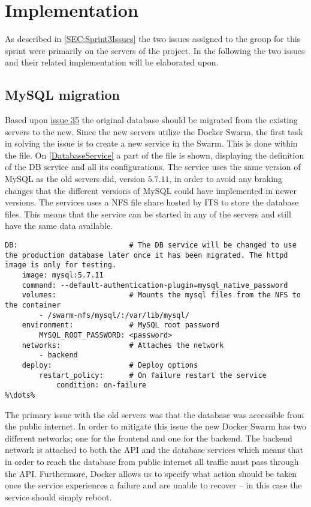 \section{Implementation}
As described in \autoref{SEC:Sprint3Issues} the two issues assigned to the group for this sprint were primarily on the servers of the project. 
In the following the two issues and their related implementation will be elaborated upon.

\subsection{MySQL migration}
Based upon \href{https://github.com/aau-giraf/wiki/issues/35}{issue 35} the original database should be migrated from the existing servers to the new. 
Since the new servers utilize the Docker Swarm, the first task in solving the issue is to create a new service in the Swarm. 
This is done within the  file. 
On \autoref{DatabaseService} a part of the file is shown, displaying the definition of the DB service and all its configurations. 
The service uses the same version of MySQL as the old servers did, version $5.7.11$, in order to avoid any braking changes that the different versions of MySQL could have implemented in newer versions. 
The services uses a NFS file share hosted by ITS to store the database files. 
This means that the service can be started in any of the servers and still have the same data available. 

\begin{lstlisting}[caption={Docker database service},captionpos=b,label=DatabaseService,escapechar=\%]
%\dots%
DB:                          # The DB service will be changed to use the production database later once it has been migrated. The httpd image is only for testing.
    image: mysql:5.7.11
    command: --default-authentication-plugin=mysql_native_password
    volumes:                 # Mounts the mysql files from the NFS to the container
        - /swarm-nfs/mysql/:/var/lib/mysql/
    environment:             # MySQL root password
        MYSQL_ROOT_PASSWORD: <password>
    networks:                # Attaches the network
        - backend
    deploy:                  # Deploy options
        restart_policy:      # On failure restart the service
            condition: on-failure
%\dots%
\end{lstlisting}

The primary issue with the old servers was that the database was accessible from the public internet.
In order to mitigate this issue the new Docker Swarm has two different networks; one for the frontend and one for the backend. 
The backend network is attached to both the API and the database services which means that in order to reach the database from public internet all traffic must pass through the API. 
Furthermore, Docker allows us to specify what action should be taken once the service experiences a failure and are unable to recover -- in this case the service should simply reboot. 

